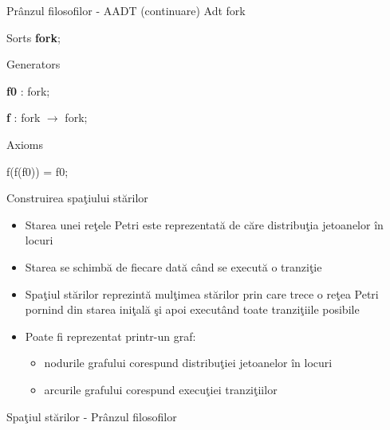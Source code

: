 \documentclass{beamer}
\begin{document}
\begin{frame}{Prânzul filosofilor - AADT (continuare)}
		Adt fork
		
		Sorts \textbf{fork};
		
		Generators
		
\hspace{0.5cm}			\textbf{f0} : fork;
			
\hspace{0.5cm}			\textbf{f}  : fork $\rightarrow$ fork; 
			
		Axioms
		
\hspace{0.5cm}			f(f(f0)) = f0;
\end{frame}



\begin{frame}{Construirea spaţiului stărilor}
\begin{itemize}
\item
Starea unei reţele Petri este reprezentată de căre distribuţia jetoanelor în locuri
\item
Starea se schimbă de fiecare dată când se execută o tranziţie
\item
Spaţiul stărilor reprezintă mulţimea stărilor prin care trece o reţea Petri pornind din starea iniţală şi apoi executând toate tranziţiile posibile
\item
Poate fi reprezentat printr-un graf:
\begin{itemize}
\item
nodurile grafului corespund distribuţiei jetoanelor în locuri
\item
arcurile grafului corespund execuţiei tranziţiilor
\end{itemize}
\end{itemize}
\end{frame}



\begin{frame}{Spaţiul stărilor - Prânzul filosofilor}
\begin{center}


\end{center}

\end{frame}
\end{document}
